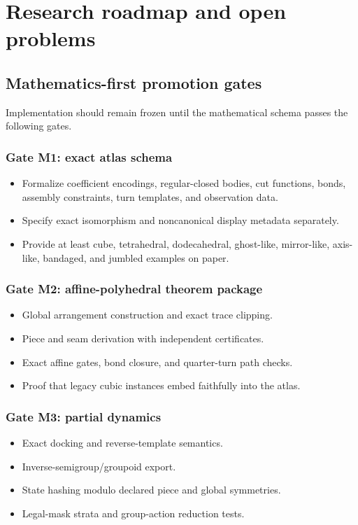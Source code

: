 \documentclass[11pt,openany]{book}
\theoremstyle{polyplain}
\theoremstyle{polydef}
\begin{document}
\chapter{Research roadmap and open problems}
\label{chap:roadmap}

\section{Mathematics-first promotion gates}

Implementation should remain frozen until the mathematical schema passes the following gates.

\subsection*{Gate M1: exact atlas schema}
\begin{itemize}
  \item Formalize coefficient encodings, regular-closed bodies, cut functions, bonds, assembly constraints, turn templates, and observation data.
  \item Specify exact isomorphism and noncanonical display metadata separately.
  \item Provide at least cube, tetrahedral, dodecahedral, ghost-like, mirror-like, axis-like, bandaged, and jumbled examples on paper.
\end{itemize}

\subsection*{Gate M2: affine-polyhedral theorem package}
\begin{itemize}
  \item Global arrangement construction and exact trace clipping.
  \item Piece and seam derivation with independent certificates.
  \item Exact affine gates, bond closure, and quarter-turn path checks.
  \item Proof that legacy cubic instances embed faithfully into the atlas.
\end{itemize}

\subsection*{Gate M3: partial dynamics}
\begin{itemize}
  \item Exact docking and reverse-template semantics.
  \item Inverse-semigroup/groupoid export.
  \item State hashing modulo declared piece and global symmetries.
  \item Legal-mask strata and group-action reduction tests.
\end{itemize}
\end{document}
